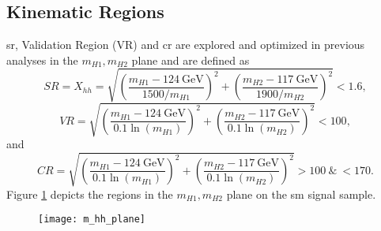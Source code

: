 \subsection{Kinematic Regions}\label{sec:kinematic_regions}
\ac{sr}, Validation Region (VR) and \ac{cr} are explored and optimized in previous analyses \citep{aad2023search,ATL-COM-PHYS-2023-033} in the $m_{H1},m_{H2}$ plane and are defined as
\begin{equation}
    SR=X_{hh} =  \sqrt{\left(\frac{m_{H1} - \SI{124}{\GeV}}{1500 / m_{H1}}\right)^{2} + \left(\frac{m_{H2} - \SI{117}{\GeV}}{1900 / m_{H2}}\right)^{2}} < 1.6,
\end{equation}
\begin{equation}
    \label{VR_Xhh}
    VR =  \sqrt{\left(\frac{m_{H1} - \SI{124}{\GeV}}{0.1 \ln(m_{H1})}\right)^{2} + \left(\frac{m_{H2} - \SI{117}{\GeV}}{0.1 \ln(m_{H2})}\right)^{2}} < 100,
\end{equation}
and
\begin{equation}
    \label{CR_Xhh}
    CR = \sqrt{\left(\frac{m_{H1} - \SI{124}{\GeV}}{0.1 \ln(m_{H1})}\right)^{2} + \left(\frac{m_{H2} - \SI{117}{\GeV}}{0.1 \ln(m_{H2})}\right)^{2}} > 100  \ \& \ < 170.
\end{equation}
Figure \ref{fig:m_hh_plane} depicts the regions in the $m_{H1},m_{H2}$ plane on the \ac{sm} signal sample.

\begin{figure}
    \centering
    \texttt{[image: m\_hh\_plane]}
    \caption[]{}
    \label{fig:m_hh_plane}
\end{figure}

